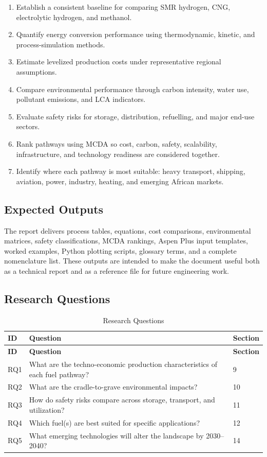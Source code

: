 \documentclass[12pt,twoside,openany]{book}
\begin{document}
\begin{enumerate}
    \item Establish a consistent baseline for comparing SMR hydrogen, CNG, electrolytic hydrogen, and methanol.
    \item Quantify energy conversion performance using thermodynamic, kinetic, and process-simulation methods.
    \item Estimate levelized production costs under representative regional assumptions.
    \item Compare environmental performance through carbon intensity, water use, pollutant emissions, and LCA indicators.
    \item Evaluate safety risks for storage, distribution, refuelling, and major end-use sectors.
    \item Rank pathways using MCDA so cost, carbon, safety, scalability, infrastructure, and technology readiness are considered together.
    \item Identify where each pathway is most suitable: heavy transport, shipping, aviation, power, industry, heating, and emerging African markets.
\end{enumerate}

\subsection{Expected Outputs}

The report delivers process tables, equations, cost comparisons, environmental matrices, safety classifications, MCDA rankings, Aspen Plus input templates, worked examples, Python plotting scripts, glossary terms, and a complete nomenclature list. These outputs are intended to make the document useful both as a technical report and as a reference file for future engineering work.

\subsection{Research Questions}

\begin{longtable}{C{1.5cm} L{8cm} C{2cm}}
\caption{Research Questions}\label{tab:rq}\\
\hline
\textbf{ID} & \textbf{Question} & \textbf{Section} \\
\hline
\endfirsthead
\hline
\textbf{ID} & \textbf{Question} & \textbf{Section} \\
\hline
\endhead
RQ1 & What are the techno-economic production characteristics of each fuel pathway? & 9 \\
RQ2 & What are the cradle-to-grave environmental impacts? & 10 \\
RQ3 & How do safety risks compare across storage, transport, and utilization? & 11 \\
RQ4 & Which fuel(s) are best suited for specific applications? & 12 \\
RQ5 & What emerging technologies will alter the landscape by 2030--2040? & 14 \\
\hline
\end{longtable}
\end{document}
